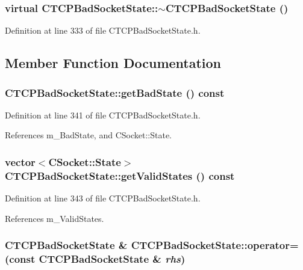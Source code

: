 \subsubsection{\setlength{\rightskip}{0pt plus 5cm}virtual CTCPBad\-Socket\-State::$\sim$CTCPBad\-Socket\-State ()\hspace{0.3cm}{\tt  [inline, virtual]}}\label{classCTCPBadSocketState_a2}




Definition at line 333 of file CTCPBad\-Socket\-State.h.

\subsection{Member Function Documentation}
\subsubsection{ CTCPBad\-Socket\-State::get\-Bad\-State () const\hspace{0.3cm}{\tt  [inline]}}\label{classCTCPBadSocketState_a5}




Definition at line 341 of file CTCPBad\-Socket\-State.h.

References m\_\-Bad\-State, and CSocket::State.
\subsubsection{\setlength{\rightskip}{0pt plus 5cm}vector$<${\bf CSocket::State}$>$ CTCPBad\-Socket\-State::get\-Valid\-States () const\hspace{0.3cm}{\tt  [inline]}}\label{classCTCPBadSocketState_a6}




Definition at line 343 of file CTCPBad\-Socket\-State.h.

References m\_\-Valid\-States.
\subsubsection{\setlength{\rightskip}{0pt plus 5cm}CTCPBad\-Socket\-State \& CTCPBad\-Socket\-State::operator= (const CTCPBad\-Socket\-State \& {\em rhs})}\label{classCTCPBadSocketState_a3}


